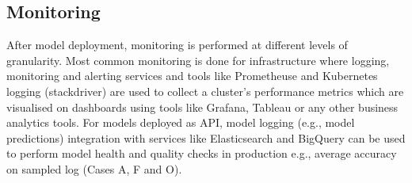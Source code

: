 \subsection{Monitoring}
After model deployment, monitoring is performed at different levels of granularity. Most common monitoring is done for infrastructure where logging, monitoring and alerting services and tools like Prometheuse and Kubernetes logging (stackdriver) are used to collect a cluster's performance metrics which are visualised on dashboards using tools like Grafana, Tableau or any other business analytics tools. For models deployed as API, model logging (e.g., model predictions) integration with services like Elasticsearch and BigQuery can be used to perform model health and quality checks in production e.g., average accuracy on sampled log (Cases A, F and O).



